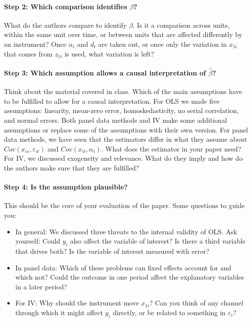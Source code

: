 \documentclass[12pt,a4paper]{article}
\begin{document}
\paragraph{Step 2: Which comparison identifies $\beta$?}
What do the authors compare to identify $\beta$. Is it a comparison across units, within the same unit over time, or between units that are affected differently by an instrument? Once $\alpha_i$ and $d_t$ are taken out, or once only the variation in $x_{1i}$ that comes from $z_{1i}$ is used, what variation is left?
 
\paragraph{Step 3: Which assumption allows a causal interpretation of $\hat{\beta}$?}
Think about the material covered in class. Which of the main assumptions have to be fulfilled to allow for a causal interpretation. For OLS we made five assumptions: linearity, mean-zero error, homoskedasticity, no serial correlation, and normal errors. Both panel data methods and IV make some additional assumptions or replace some of the assumptions with their own version. For panel data methods, we have seen that the estimators differ in what they assume about $Cov(x_{is}, \varepsilon_{it})$ and $Cov(x_{it}, \alpha_i)$. What does the estimator in your paper need? For IV, we discussed exogeneity and relevance. What do they imply and how do the authors make sure that they are fulfilled? 
 
\paragraph{Step 4: Is the assumption plausible?}
This should be the core of your evaluation of the paper. Some questions to guide you:
\begin{itemize}[leftmargin=*, itemsep=2pt]
  \item In general: We discussed three threats to the internal validity of OLS. Ask yourself: Could $y_i$ also affect the variable of interest? Is there a third variable that drives both? Is the variable of interest measured with error?
  \item In panel data: Which of these problems can fixed effects account for and which not? Could the outcome in one  period affect the explanatory variables in a later period?
  \item For IV: Why should the instrument move $x_{1i}$? Can you think of any channel through which it might affect $y_i$ directly, or be related to something in $\varepsilon_i$?
\end{itemize}
 
\end{document}
